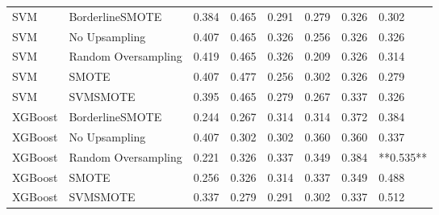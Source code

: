\begin{tabular}{llllllll}
                         SVM &     BorderlineSMOTE &     0.384 &                     0.465 &                 0.291 &                  0.279 &                                   0.326 &     0.302 \\
                         SVM &       No Upsampling &     0.407 &                     0.465 &                 0.326 &                  0.256 &                                   0.326 &     0.326 \\
                         SVM & Random Oversampling &     0.419 &                     0.465 &                 0.326 &                  0.209 &                                   0.326 &     0.314 \\
                         SVM &               SMOTE &     0.407 &                     0.477 &                 0.256 &                  0.302 &                                   0.326 &     0.279 \\
                         SVM &            SVMSMOTE &     0.395 &                     0.465 &                 0.279 &                  0.267 &                                   0.337 &     0.326 \\
                     XGBoost &     BorderlineSMOTE &     0.244 &                     0.267 &                 0.314 &                  0.314 &                                   0.372 &     0.384 \\
                     XGBoost &       No Upsampling &     0.407 &                     0.302 &                 0.302 &                  0.360 &                                   0.360 &     0.337 \\
                     XGBoost & Random Oversampling &     0.221 &                     0.326 &                 0.337 &                  0.349 &                                   0.384 & **0.535** \\
                     XGBoost &               SMOTE &     0.256 &                     0.326 &                 0.314 &                  0.337 &                                   0.349 &     0.488 \\
                     XGBoost &            SVMSMOTE &     0.337 &                     0.279 &                 0.291 &                  0.302 &                                   0.337 &     0.512 \\
\bottomrule
\end{tabular}
